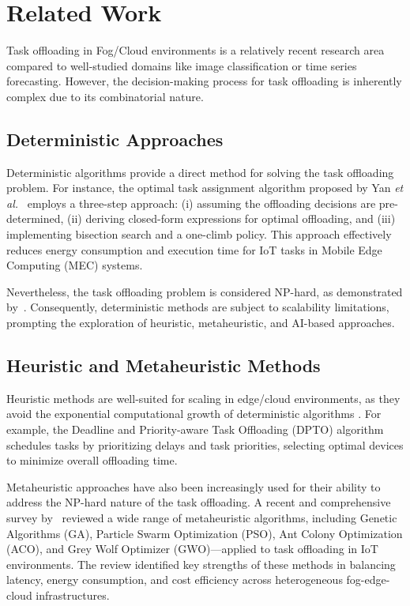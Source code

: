 \documentclass[preprint,3p,authoryear]{elsarticle}
\begin{document}
\section{Related Work}\label{sec:related_work}


Task offloading in Fog/Cloud environments is a relatively recent research area compared to well-studied domains like image classification or time series forecasting. However, the decision-making process for task offloading is inherently complex due to its combinatorial nature.

\subsection{Deterministic Approaches}
Deterministic algorithms provide a direct method for solving the task offloading problem. For instance, the optimal task assignment algorithm proposed by Yan \textit{et al.}~\cite{yan_optimal_2020} employs a three-step approach: (i) assuming the offloading decisions are pre-determined, (ii) deriving closed-form expressions for optimal offloading, and (iii) implementing bisection search and a one-climb policy. This approach effectively reduces energy consumption and execution time for IoT tasks in Mobile Edge Computing (MEC) systems.

Nevertheless, the task offloading problem is considered NP-hard, as demonstrated by~\cite{guo_algorithmics_2024, jin_task_2024, sarkar_deep_2022}. Consequently, deterministic methods are subject to scalability limitations, prompting the exploration of heuristic, metaheuristic, and AI-based approaches.


\subsection{Heuristic and Metaheuristic Methods}

Heuristic methods are well-suited for scaling in edge/cloud environments, as they avoid the exponential computational growth of deterministic algorithms \cite{zhang_survey_2024}. For example, the Deadline and Priority-aware Task Offloading (DPTO) algorithm \cite{adhikari_dpto_2020} schedules tasks by prioritizing delays and task priorities, selecting optimal devices to minimize overall offloading time.

Metaheuristic approaches have also been increasingly used for their ability to address the NP-hard nature of the task offloading. A recent and comprehensive survey by~\cite{rahmani_optimizing_2025} reviewed a wide range of metaheuristic algorithms, including Genetic Algorithms (GA), Particle Swarm Optimization (PSO), Ant Colony Optimization (ACO), and Grey Wolf Optimizer (GWO)—applied to task offloading in IoT environments. The review identified key strengths of these methods in balancing latency, energy consumption, and cost efficiency across heterogeneous fog-edge-cloud infrastructures.
\end{document}
